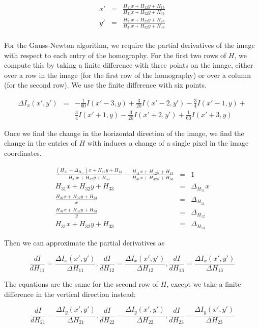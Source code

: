 \begin{eqnarray*}
x' &=& \frac{H_{11}x + H_{12}y + H_{13}}{H_{31}x + H_{32}y + H_{33}}\\
y' &=& \frac{H_{21}x + H_{22}y + H_{23}}{H_{31}x + H_{32}y + H_{33}}\\
\end{eqnarray*}

For the Gauss-Newton algorithm, we require the partial derivatives of the image
with respect to each entry of the homography. For the first two rows of $H$, we
compute this by taking a finite difference with three points on the image, either
over a row in the image (for the first row of the homography) or over a column 
(for the second row). We use the finite difference with six points.

\begin{eqnarray*}
	\Delta I_x(x', y') &=& -\frac{1}{60}I(x'-3, y) + \frac{3}{20}I(x'-2, y') - \frac{3}{4} I(x'-1, y) +\\
			&& \frac{3}{4} I(x'+1, y) -\frac{3}{20}I(x'+2, y') + \frac{1}{60}I(x'+3, y)
\end{eqnarray*}

Once we find the change in the horizontal direction of the image, we find the change in the entries of $H$ with induces
a change of a single pixel in the image coordinates.

\begin{eqnarray*}
	\frac{(H_{11} + \Delta_{H_{11}}) x + H_{12}y + H_{13}}{H_{31}x + H_{32}y + H_{33}} - \frac{H_{11}x + H_{12}y + H_{13}}{H_{31}x + H_{32}y + H_{33}} &=& 1\\
	H_{31}x + H_{32}y + H_{33} &=& \Delta_{H_{11}} x\\
	\frac{H_{31}x + H_{32}y + H_{33}}{x} &=& \Delta_{H_{11}}\\
	\frac{H_{31}x + H_{32}y + H_{33}}{y} &=& \Delta_{H_{12}}\\
	H_{31}x + H_{32}y + H_{33} &=& \Delta_{H_{13}}
\end{eqnarray*}

Then we can approximate the partial derivatives as

$$\frac{dI}{dH_{11}} = \frac{\Delta I_x(x', y')}{\Delta H_{11}}, 
\frac{dI}{dH_{12}} = \frac{\Delta I_x(x', y')}{\Delta H_{12}}, 
\frac{dI}{dH_{13}} = \frac{\Delta I_x(x', y')}{\Delta H_{13}}$$

The equations are the same for the second row of $H$, except we take a finite
difference in the vertical direction instead:

$$\frac{dI}{dH_{21}} = \frac{\Delta I_y(x', y')}{\Delta H_{21}}, 
\frac{dI}{dH_{22}} = \frac{\Delta I_y(x', y')}{\Delta H_{22}}, 
\frac{dI}{dH_{23}} = \frac{\Delta I_y(x', y')}{\Delta H_{23}}$$

